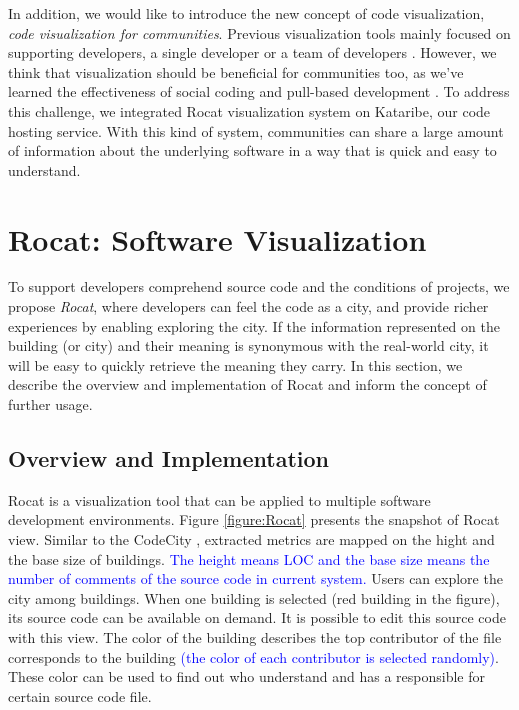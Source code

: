 \documentclass[conference]{IEEEtran}
\newcommand{\figref}[1]{Figure \ref{#1}}
\begin{document}
In addition, we would like to introduce the new concept of code visualization, \textit{code visualization for communities}.
Previous visualization tools mainly focused on supporting developers, a single developer \cite{Wettel:2011:SSC:1985793.1985868} or a team of developers \cite{6648194}.
However, we think that visualization should be beneficial for communities too, as we've learned the effectiveness of social coding \cite{Dabbish:2012:SCG:2145204.2145396} and pull-based development \cite{Gousios:2014:ESP:2568225.2568260}.
To address this challenge, we integrated Rocat visualization system on Kataribe,  our code hosting service.
With this kind of system, communities can share a large amount of information about the underlying software in a way that is quick and easy to understand.

\section{Rocat: Software Visualization}
To support developers comprehend source code and the conditions of projects, we propose \textit{Rocat}, where developers can feel the code as a city, and provide richer experiences by enabling exploring the city.
If the information represented on the building (or city) and their meaning is synonymous with the real-world city, it will be easy to quickly retrieve the meaning they carry.
In this section, we describe the overview and implementation of Rocat and inform the concept of further usage.

\subsection{Overview and Implementation}
Rocat is a visualization tool that can be applied to multiple software development environments.
\figref{figure:Rocat} presents the snapshot of Rocat view.
Similar to the CodeCity \cite{Wettel:2011:SSC:1985793.1985868}, extracted metrics are mapped on the hight and the base size of buildings.
\textcolor{blue}{The height means LOC and the base size means the number of comments of the source code in current system.}
Users can explore the city among buildings.
When one building is selected (red building in the figure), its source code can be available on demand.
It is possible to edit this source code with this view.
The color of the building describes the top contributor of the file corresponds to the building \textcolor{blue}{(the color of each contributor is selected randomly)}.
These color can be used to find out who understand and has a responsible for certain source code file.
\end{document}
